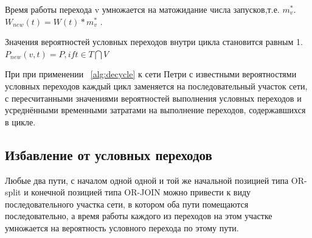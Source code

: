 \documentclass[a4paper,12pt]{article}
\begin{document}
\begin{algorithm}[!h]
\begin{enumerate}
{	


	
	 {
		Время работы перехода v умножается на матожидание числа запусков,т.е. $m^{*}_{v}$.\\
		$W_{new}(t) = W(t)*m^{*}_{v}$ .
	
	}
	 {	
		Значения вероятностей условных переходов внутри цикла становится равным 1.\\
		$P_{new}(v, t) = P , if t \in T \bigcap V$  
		
	}
}
\end{enumerate} 
\label{alg:decycle}
\end{algorithm}			
	
	При при применении ~\cref{alg:decycle} к сети Петри с известными вероятностями условных переходов каждый цикл заменяется на последовательный участок сети, с пересчитанными значениями вероятностей выполнения условных переходов и  усреднёнными временными затратами на выполнение переходов, содержавшихся в цикле. 
		
\subsection*{Избавление от условных переходов}	
Любые два пути, с началом одной одной и той же начальной позицией типа OR-split и конечной позицией типа OR-JOIN можно привести к виду последовательного участка сети, в котором оба пути помещаются последовательно, а время работы каждого из переходов на этом участке умножается на вероятность условного перехода по этому пути.
\end{document}
